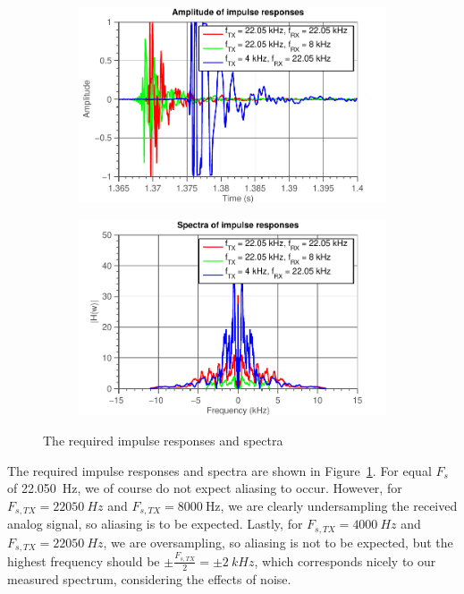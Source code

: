 \documentclass[11pt,titlepage]{report}
\begin{document}
\begin{figure}[H]
	\centering
	\begin{subfigure}{0.49\textwidth}
		\includegraphics[width=\textwidth]{../../deliverable-7-resources/figures/ass-1/report-11-12-13/ass-1-report-11-time.pdf}
	\end{subfigure}
	\begin{subfigure}{0.49\textwidth}
		\includegraphics[width=\textwidth]{../../deliverable-7-resources/figures/ass-1/report-11-12-13/ass-1-report-11.pdf}
	\end{subfigure}
	\caption{The required impulse responses and spectra}
	\label{fig:rep11-impulse-spectra}
\end{figure}

The required impulse responses and spectra are shown in Figure~\ref{fig:rep11-impulse-spectra}. For equal $F_s$ of \SI{22,050}{\hertz}, we of course do not expect aliasing to occur. However, for $F_{s,TX} = \SI{22050}{Hz}$ and $F_{s,TX} = \SI{8000}{\hertz}$, we are clearly undersampling the received analog signal, so aliasing is to be expected. Lastly, for $F_{s,TX} = \SI{4000}{Hz}$ and $F_{s,TX} = \SI{22050}{Hz}$, we are oversampling, so aliasing is not to be expected, but the highest frequency should be $\pm \frac{F_{s,TX}}{2} = \pm \SI{2}{kHz}$, which corresponds nicely to our measured spectrum, considering the effects of noise.
\end{document}
